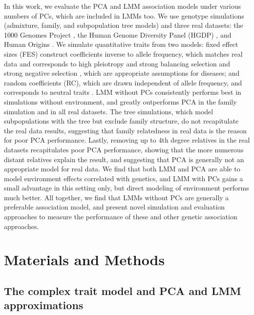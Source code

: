 \documentclass[11pt]{article}
\begin{document}
\begin{linenumbers}
In this work, we evaluate the PCA and LMM association models under various numbers of PCs, which are included in LMMs too.
We use genotype simulations (admixture, family, and subpopulation tree models) and three real datasets: the 1000 Genomes Project \citep{the_1000_genomes_project_consortium_map_2010, 1000_genomes_project_consortium_integrated_2012}, the Human Genome Diversity Panel (HGDP) \citep{cann_human_2002, rosenberg_genetic_2002, bergstrom_insights_2020}, and Human Origins \citep{patterson_ancient_2012, lazaridis_ancient_2014, lazaridis_genomic_2016, skoglund_genomic_2016}.
We simulate quantitative traits from two models: fixed effect sizes (FES) construct coefficients inverse to allele frequency, which matches real data \citep{park_distribution_2011, zeng_signatures_2018, oconnor_extreme_2019} and corresponds to high pleiotropy and strong balancing selection \citep{simons_population_2018} and strong negative selection \citep{zeng_signatures_2018, oconnor_extreme_2019}, which are appropriate assumptions for diseases; and random coefficients (RC), which are drawn independent of allele frequency, and corresponds to neutral traits \citep{zeng_signatures_2018, simons_population_2018}.
LMM without PCs consistently performs best in simulations without environment, and greatly outperforms PCA in the family simulation and in all real datasets.
The tree simulations, which model subpopulations with the tree but exclude family structure, do not recapitulate the real data results, suggesting that family relatedness in real data is the reason for poor PCA performance.
Lastly, removing up to 4th degree relatives in the real datasets recapitulates poor PCA performance, showing that the more numerous distant relatives explain the result, and suggesting that PCA is generally not an appropriate model for real data.
We find that both LMM and PCA are able to model environment effects correlated with genetics, and LMM with PCs gains a small advantage in this setting only, but direct modeling of environment performs much better.
All together, we find that LMMs without PCs are generally a preferable association model, and present novel simulation and evaluation approaches to measure the performance of these and other genetic association approaches.

\section{Materials and Methods}

\subsection{The complex trait model and PCA and LMM approximations}


\end{linenumbers}
\end{document}
